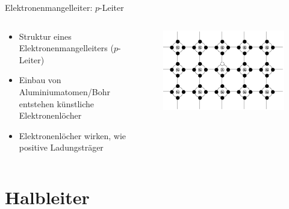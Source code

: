 \documentclass[12pt%
,aspectratio=169%
]{beamer}
\begin{document}
\begin{frame}{Elektronenmangelleiter: $p$-Leiter}
\begin{columns}[T] %
\begin{column}{.48\textwidth}
\begin{itemize}
	\item Struktur eines Elektronenmangelleiters ($p$-Leiter)
	\item Einbau von Aluminiumatomen/Bohr entstehen künstliche Elektronenlöcher
	\item Elektronenlöcher wirken, wie positive Ladungsträger
\end{itemize}
\end{column}%
\hfill%
\begin{column}{.48\textwidth}
\begin{figure}
\center
\includegraphics[scale=0.3]{pictures/p_leiter}
\end{figure}
\end{column}%
\end{columns}
\end{frame}

\section{Halbleiter}
\end{document}

